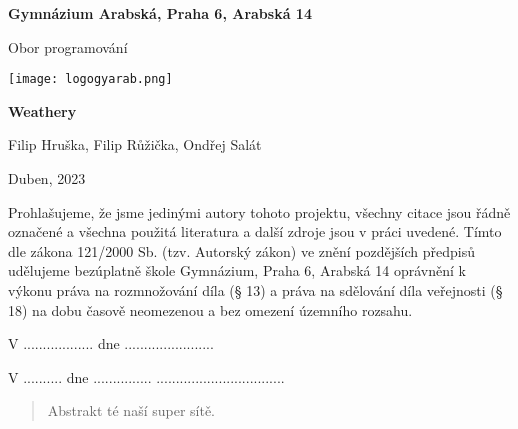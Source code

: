 \begin{titlepage}
\begin{center}
\large \vspace*{\fill}
\thispagestyle{empty}

\LARGE

{ \huge \textbf{Gymnázium Arabská, Praha 6, Arabská 14}}

{\LARGE Obor programování }

\vfill
\texttt{[image: logogyarab.png]}
\vspace{15pt}

\vfill

{\huge \textbf{Weathery}}

\vfill

Filip Hruška, Filip Růžička, Ondřej Salát

\vfill

{\large Duben, 2023}

\vspace*{\fill}
\end{center}
\end{titlepage}

\thispagestyle{empty}
\addtocounter{page}{-1}
\vspace*{\fill}
Prohlašujeme, že jsme jedinými autory tohoto projektu, všechny citace jsou řádně označené a všechna 
použitá literatura a další zdroje jsou v práci uvedené. Tímto dle zákona 121/2000 Sb. (tzv. Autorský zákon) 
ve znění pozdějších předpisů udělujeme bezúplatně škole Gymnázium, Praha 6, Arabská 14 oprávnění k výkonu 
práva na rozmnožování díla (§ 13) a práva na sdělování díla veřejnosti (§ 18) na dobu časově neomezenou a 
bez omezení územního rozsahu.

\vspace{2cm}
V .................. dne .......................


\vspace{2cm}


\vspace{2cm}


\vspace{2cm}
V .......... dne ............... \hspace{4cm} .................................
\vspace{2cm}

\newpage
\begin{abstract}
	Abstrakt té naší super sítě.
\end{abstract}


\tableofcontents
